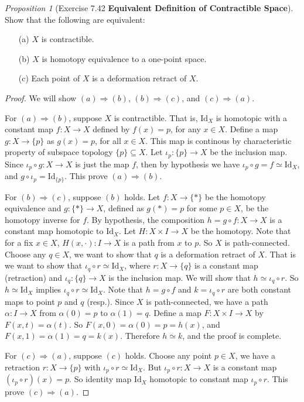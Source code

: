 \documentclass[a4paper]{article}
\theoremstyle{remark}
\newtheorem{prop}{Proposition}
\newcommand{\subhim}{\subseteq} %
\newcommand{\Id}{\text{Id}} %
\begin{document}
\begin{prop}[Exercise 7.42 \textbf{Equivalent Definition of Contractible Space}]
	Show that the following are equivalent:
	\begin{enumerate}[nolistsep]
		\item[(a)] $X$ is contractible.
		\item [(b)] $X$ is homotopy equivalence to a one-point space.
		\item [(c)] Each point of $X$ is a deformation retract of $X$.
	\end{enumerate}
\end{prop}
\begin{proof}
	We will show $(a) \Rightarrow (b)$, $(b) \Rightarrow (c)$, and $(c) \Rightarrow (a)$. 
	
	For $(a) \Rightarrow (b)$, suppose $X$ is contractible. That is, $\Id_X$ is homotopic with a constant map $f : X \to X$ defined by $f(x) = p$, for any $x\in X$. Define a map $g : X \to \{p\}$ as $g(x) = p$, for all $x\in X$. This map is continous by characteristic property of subspace topology $\{p\} \subhim X$. Let $\iota_p : \{p\} \to X$ be the inclusion map. Since $\iota_p \circ g : X \to X$ is just the map $f$, then by hypothesis we have $\iota_p \circ g = f \simeq \Id_X$, and $g \circ \iota_p = \Id_{\{p\}}$. This prove $(a) \Rightarrow (b)$. 
	
	For $(b) \Rightarrow (c)$, suppose $(b)$ holds. Let $f : X \to \{*\}$ be the homotopy equivalence and $g : \{*\} \to X$, defined as $g(*) = p$ for some $p \in X$, be the homotopy inverse for $f$. By hypothesis, the composition $h=g \circ f : X \to X$ is a constant map homotopic to $\Id_X$. Let $H  : X \times I \to X$ be the homotopy. Note that for a fix $x \in X$, $H(x,\cdot) : I \to X$ is a path from $x$ to $p$. So $X$ is path-connected. Choose any $q \in X$, we want to show that $q$ is a deformation retract of $X$. That is we want to show that $\iota_q \circ r \simeq \Id_X$, where $r : X \to \{q\}$ is a constant map (retraction) and $\iota_q : \{q\} \to X$ is the inclusion map. We will show that $h \simeq \iota_q \circ r$. So $h \simeq \Id_X$ implies $\iota_q \circ r \simeq \Id_X$. Note that $h = g \circ f$ and $k = \iota_q \circ r$ are both constant maps to point $p$ and $q$ (resp.). Since $X$ is path-connected, we have a path $\alpha : I \to X$ from $\alpha(0) = p$ to $\alpha(1) =q$. Define a map $F : X \times I \to X$ by $F(x,t) = \alpha(t)$. So $F(x,0) = \alpha(0) = p = h(x)$, and $F(x,1) = \alpha(1) = q = k(x)$. Therefore $h \simeq k$, and the proof is complete.
	
	For $(c) \Rightarrow (a)$, suppose $(c)$ holds. Choose any point $p \in X$, we have a retraction $r : X \to \{p\}$ with $\iota_p \circ r \simeq \Id_X$. But $\iota_p \circ r : X \to X$ is a constant map $(\iota_p \circ r)(x) = p$. So identity map $\Id_X$ homotopic to constant map $\iota_p \circ r$. This prove $(c) \Rightarrow (a)$. 
\end{proof}
\end{document}
